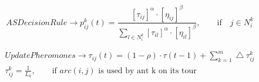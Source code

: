 \documentclass[11pt,a4paper]{article}
\theoremstyle{definition}%
\begin{document}
\begin{equation}\label{eq:deci}
	ASDecisionRule \rightarrow p_{ij}^k(t) = 
	\frac{\left[\tau_{ij}\right]^{\alpha}\cdot\left[\eta_{ij}\right]^\beta}
	 {\sum_{l \in N_i^k} 
	\left[\tau_{il}\right]^{\alpha}\cdot\left[\eta_{il}\right]^\beta},
	\qquad \text{if} \quad j\in N_i^k
\end{equation}

\begin{equation}\label{eq:phero}
\begin{aligned}
	UpdatePheromones \rightarrow \tau_{ij}(t) = 
	(1-\rho)\cdot\tau(t-1) + \sum_{k=1}^{m}\bigtriangleup\tau_{ij}^k 
	\\
	\tau_{ij}^k = \frac{1}{L_k}, \qquad \text{if $arc(i,j)$ is used 
	by 
	ant k on its tour}
\end{aligned}
\end{equation}
\end{document}
